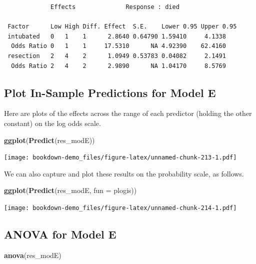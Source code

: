 \documentclass[]{book}
\newenvironment{Shaded}{\begin{snugshade}}{\end{snugshade}}
\newcommand{\KeywordTok}[1]{\textcolor[rgb]{0.13,0.29,0.53}{\textbf{#1}}}
\newcommand{\DataTypeTok}[1]{\textcolor[rgb]{0.13,0.29,0.53}{#1}}
\newcommand{\NormalTok}[1]{#1}
\theoremstyle{definition}
\theoremstyle{definition}
\theoremstyle{definition}
\theoremstyle{remark}
\begin{document}
\begin{verbatim}
             Effects              Response : died 

 Factor      Low High Diff. Effect  S.E.    Lower 0.95 Upper 0.95
 intubated   0   1    1      2.8640 0.64790 1.59410     4.1338   
  Odds Ratio 0   1    1     17.5310      NA 4.92390    62.4160   
 resection   2   4    2      1.0949 0.53783 0.04082     2.1491   
  Odds Ratio 2   4    2      2.9890      NA 1.04170     8.5769   
\end{verbatim}

\subsection{Plot In-Sample Predictions for Model
E}\label{plot-in-sample-predictions-for-model-e}

Here are plots of the effects across the range of each predictor
(holding the other constant) on the log odds scale.

\begin{Shaded}
\begin{Highlighting}[]
\KeywordTok{ggplot}\NormalTok{(}\KeywordTok{Predict}\NormalTok{(res_modE))}
\end{Highlighting}
\end{Shaded}

\texttt{[image: bookdown-demo\_files/figure-latex/unnamed-chunk-213-1.pdf]}

We can also capture and plot these results on the probability scale, as
follows.

\begin{Shaded}
\begin{Highlighting}[]
\KeywordTok{ggplot}\NormalTok{(}\KeywordTok{Predict}\NormalTok{(res_modE, }\DataTypeTok{fun =}\NormalTok{ plogis))}
\end{Highlighting}
\end{Shaded}

\texttt{[image: bookdown-demo\_files/figure-latex/unnamed-chunk-214-1.pdf]}

\subsection{ANOVA for Model E}\label{anova-for-model-e}

\begin{Shaded}
\begin{Highlighting}[]
\KeywordTok{anova}\NormalTok{(res_modE)}
\end{Highlighting}
\end{Shaded}
\end{document}
